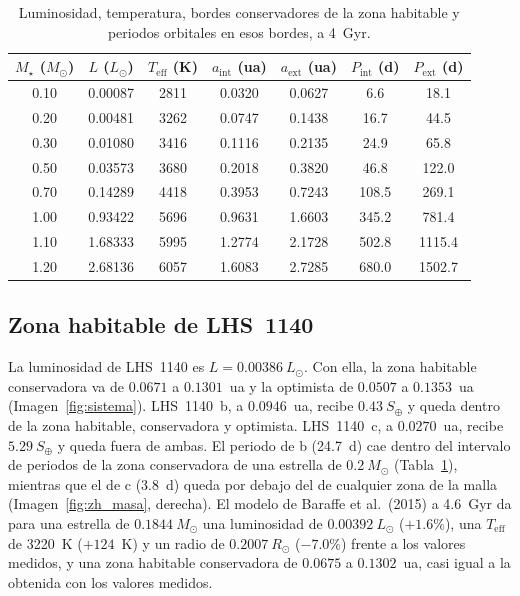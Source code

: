 \documentclass[twocolumn,aps,pra,11pt]{revtex4-2}
\newcommand{\Msun}{\ensuremath{M_\odot}}
\newcommand{\Rsun}{\ensuremath{R_\odot}}
\newcommand{\Lsun}{\ensuremath{L_\odot}}
\begin{document}
\begin{table}[!t]
\centering\small
\caption{Luminosidad, temperatura, bordes conservadores de la zona habitable y periodos orbitales en esos bordes, a 4~Gyr.}\label{tab:zh}
\begin{tabular}{ccccccc}
\toprule
$M_\star$ (\Msun) & $L$ (\Lsun) & $T_\mathrm{eff}$ (K) & $a_\mathrm{int}$ (ua) & $a_\mathrm{ext}$ (ua) & $P_\mathrm{int}$ (d) & $P_\mathrm{ext}$ (d)\\
\midrule
0.10 & 0.00087 & 2811 & 0.0320 & 0.0627 & 6.6 & 18.1\\
0.20 & 0.00481 & 3262 & 0.0747 & 0.1438 & 16.7 & 44.5\\
0.30 & 0.01080 & 3416 & 0.1116 & 0.2135 & 24.9 & 65.8\\
0.50 & 0.03573 & 3680 & 0.2018 & 0.3820 & 46.8 & 122.0\\
0.70 & 0.14289 & 4418 & 0.3953 & 0.7243 & 108.5 & 269.1\\
1.00 & 0.93422 & 5696 & 0.9631 & 1.6603 & 345.2 & 781.4\\
1.10 & 1.68333 & 5995 & 1.2774 & 2.1728 & 502.8 & 1115.4\\
1.20 & 2.68136 & 6057 & 1.6083 & 2.7285 & 680.0 & 1502.7\\
\bottomrule
\end{tabular}
\end{table}

\subsection{Zona habitable de LHS~1140}

La luminosidad de LHS~1140 es $L = 0.00386~\Lsun$. Con ella, la zona habitable conservadora va de $0.0671$ a $0.1301$~ua y la optimista de $0.0507$ a $0.1353$~ua (Imagen~\ref{fig:sistema}). LHS~1140~b, a $0.0946$~ua, recibe $0.43~S_\oplus$ y queda dentro de la zona habitable, conservadora y optimista. LHS~1140~c, a $0.0270$~ua, recibe $5.29~S_\oplus$ y queda fuera de ambas. El periodo de b (24.7~d) cae dentro del intervalo de periodos de la zona conservadora de una estrella de $0.2~\Msun$ (Tabla~\ref{tab:zh}), mientras que el de c (3.8~d) queda por debajo del de cualquier zona de la malla (Imagen~\ref{fig:zh_masa}, derecha). El modelo de Baraffe et al.\ (2015) a 4.6~Gyr da para una estrella de $0.1844~\Msun$ una luminosidad de $0.00392~\Lsun$ ($+1.6\%$), una $T_\mathrm{eff}$ de 3220~K ($+124$~K) y un radio de $0.2007~\Rsun$ ($-7.0\%$) frente a los valores medidos, y una zona habitable conservadora de $0.0675$ a $0.1302$~ua, casi igual a la obtenida con los valores medidos.
\end{document}
